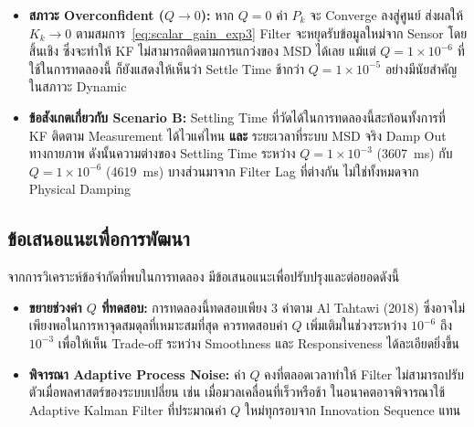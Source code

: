 \begin{itemize}
    \item \textbf{สภาวะ Overconfident ($Q \to 0$):}
          หาก $Q = 0$ ค่า $P_k$ จะ Converge ลงสู่ศูนย์
          ส่งผลให้ $K_k \rightarrow 0$ ตามสมการ~\eqref{eq:scalar_gain_exp3}
          Filter จะหยุดรับข้อมูลใหม่จาก Sensor โดยสิ้นเชิง
          ซึ่งจะทำให้ KF ไม่สามารถติดตามการแกว่งของ MSD ได้เลย
          แม้แต่ $Q = 1\times10^{-6}$ ที่ใช้ในการทดลองนี้
          ก็ยังแสดงให้เห็นว่า Settle Time ช้ากว่า $Q = 1\times10^{-5}$
          อย่างมีนัยสำคัญในสภาวะ Dynamic

    \item \textbf{ข้อสังเกตเกี่ยวกับ Scenario B:}
          Settling Time ที่วัดได้ในการทดลองนี้สะท้อนทั้งการที่ KF ติดตาม
          Measurement ได้ไวแค่ไหน \textbf{และ} ระยะเวลาที่ระบบ MSD จริง
          Damp Out ทางกายภาพ ดังนั้นความต่างของ Settling Time ระหว่าง
          $Q = 1\times10^{-3}$ (3607~ms) กับ $Q = 1\times10^{-6}$ (4619~ms)
          บางส่วนมาจาก Filter Lag ที่ต่างกัน ไม่ใช่ทั้งหมดจาก Physical Damping
\end{itemize}

\subsection{ข้อเสนอแนะเพื่อการพัฒนา}
 
จากการวิเคราะห์ข้อจำกัดที่พบในการทดลอง มีข้อเสนอแนะเพื่อปรับปรุงและต่อยอดดังนี้
 
\begin{itemize}
    \item \textbf{ขยายช่วงค่า $Q$ ที่ทดสอบ:} การทดลองนี้ทดสอบเพียง 3 ค่าตาม Al Tahtawi (2018) ซึ่งอาจไม่เพียงพอในการหาจุดสมดุลที่เหมาะสมที่สุด ควรทดสอบค่า $Q$ เพิ่มเติมในช่วงระหว่าง $10^{-6}$ ถึง $10^{-3}$ เพื่อให้เห็น Trade-off ระหว่าง Smoothness และ Responsiveness ได้ละเอียดยิ่งขึ้น
    \item \textbf{พิจารณา Adaptive Process Noise:} ค่า $Q$ คงที่ตลอดเวลาทำให้ Filter ไม่สามารถปรับตัวเมื่อพลศาสตร์ของระบบเปลี่ยน เช่น เมื่อมวลเคลื่อนที่เร็วหรือช้า ในอนาคตอาจพิจารณาใช้ Adaptive Kalman Filter ที่ประมาณค่า $Q$ ใหม่ทุกรอบจาก Innovation Sequence แทน
\end{itemize}
